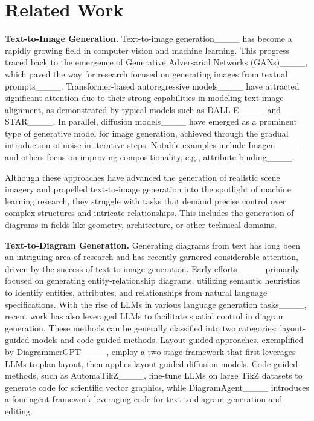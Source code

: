 \section{Related Work}

\noindent 
\textbf{Text-to-Image Generation.}
Text-to-image generation____ has become a rapidly growing field in computer vision and machine learning.
This progress traced back to the emergence of Generative Adversarial Networks (GANs)____, which paved the way for research focused on generating images from textual prompts____.
Transformer-based autoregressive models____ have attracted significant attention due to their strong capabilities in modeling text-image alignment, as demonstrated by typical models such as DALL-E____ and STAR____. 
In parallel, diffusion models____ have emerged as a prominent type of generative model for image generation, achieved through the gradual introduction of noise in iterative steps. Notable examples include Imagen____
and others focus on improving compositionality,
e.g., attribute binding____. 

Although these approaches have advanced the generation of realistic scene imagery and propelled text-to-image generation into the spotlight of machine learning research, they struggle with tasks that demand precise control over complex structures and intricate relationships. This includes the generation of diagrams in fields like geometry, architecture, or other technical domains.

\noindent 
\textbf{Text-to-Diagram Generation.}
Generating diagrams from text has long been an intriguing area of research and has recently garnered considerable attention, driven by the success of text-to-image generation. Early efforts____ primarily focused on generating entity-relationship diagrams, utilizing semantic heuristics to identify entities, attributes, and relationships from natural language specifications. With the rise of LLMs in various language generation tasks____, recent work has also leveraged LLMs to facilitate spatial control in diagram generation. 
These methods can be generally classified into two categories: layout-guided models and code-guided methods. Layout-guided approaches, exemplified by DiagrammerGPT____, employ a two-stage framework that first leverages LLMs to plan layout, then applies layout-guided diffusion models.
Code-guided methods, such as AutomaTikZ____, fine-tune LLMs on large TikZ datasets to generate code for scientific vector graphics, while DiagramAgent____ introduces a four-agent framework leveraging code for text-to-diagram generation and editing.

